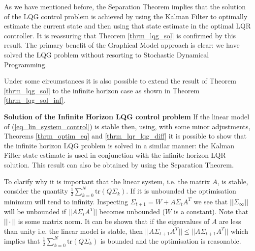 As we have mentioned before, the Separation Theorem implies that the solution of the LQG control problem is achieved by using the Kalman Filter to optimally estimate the current state and then using that state estimate in the optimal LQR controller. It is reassuring that Theorem \ref{thrm_lqg_sol} is confirmed by this result. The primary benefit of the Graphical Model approach is clear: we have solved the LQG problem without resorting to Stochastic Dynamical Programming.

Under some circumstances it is also possible to extend the result of Theorem \ref{thrm_lqg_sol} to the infinite horizon case as shown in Theorem \ref{thrm_lqg_sol_inf}.
\begin{thrm}
\textbf{Solution of the Infinite Horizon LQG control problem} If the linear model of (\ref{eq_lin_system_control}) is stable then, using, with some minor adjustments, Theorems \ref{thrm_optim_eq} and \ref{thrm_lqr_lqg_diff} it is possible to show that the infinite horizon LQG problem is solved in a similar manner: the Kalman Filter state estimate is used in conjunction with the infinite horizon LQR solution. This result can also be obtained by using the Separation Theorem. \label{thrm_lqg_sol_inf}
\end{thrm}
To clarify why it is important that the linear system, i.e. the matrix $A$, is stable, consider the quantity $\frac{1}{2}\sum_{k=0}^N \text{tr}(Q\Sigma_k)$. If it is unbounded the optimisation minimum will tend to infinity. Inspecting $\Sigma_{t+1} = W+A\Sigma_t A^T$ we see that $||\Sigma_{\infty}||$ will be unbounded if $||A\Sigma_t A^T||$ becomes unbounded ($W$ is a constant). Note that $||\cdot||$ is some matrix norm. It can be shown that if the eigenvalues of $A$ are less than unity i.e. the linear model is stable, then $||A\Sigma_{t+1}A^T|| \leq ||A\Sigma_{t+1}A^T||$ which implies that $\frac{1}{2}\sum_{k=0}^N \text{tr}(Q\Sigma_k)$ is bounded and the optimisation is reasonable.


